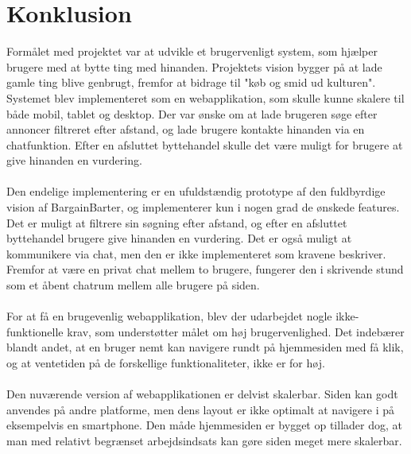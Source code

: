 \chapter{Konklusion}
Formålet med projektet var at udvikle et brugervenligt system, som hjælper brugere med at bytte ting med hinanden. Projektets vision bygger på at lade gamle ting blive genbrugt, fremfor at bidrage til "køb og smid ud kulturen". Systemet blev implementeret som en webapplikation, som skulle kunne skalere til både mobil, tablet og desktop. Der var ønske om at lade brugeren søge efter annoncer filtreret efter afstand, og lade brugere kontakte hinanden via en chatfunktion. Efter en afsluttet byttehandel skulle det være muligt for brugere at give hinanden en vurdering. \\ \\ \noindent
Den endelige implementering er en ufuldstændig prototype af den fuldbyrdige vision af BargainBarter, og implementerer kun i nogen grad de ønskede features. Det er muligt at filtrere sin søgning efter afstand, og efter en afsluttet byttehandel brugere give hinanden en vurdering. Det er også muligt at kommunikere via chat, men den er ikke implementeret som kravene beskriver. Fremfor at være en privat chat mellem to brugere, fungerer den i skrivende stund som et åbent chatrum mellem alle brugere på siden. 
\\ \\ \noindent
For at få en brugevenlig webapplikation, blev der udarbejdet nogle ikke-funktionelle krav, som understøtter målet om høj brugervenlighed. Det indebærer blandt andet, at en bruger nemt kan navigere rundt på hjemmesiden med få klik, og at ventetiden på de forskellige funktionaliteter, ikke er for høj. \\ \\ \noindent
Den nuværende version af webapplikationen er delvist skalerbar. Siden kan godt anvendes på andre platforme, men dens layout er ikke optimalt at navigere i på eksempelvis en smartphone. Den måde hjemmesiden er bygget op tillader dog, at man med relativt begrænset arbejdsindsats kan gøre siden meget mere skalerbar. 




